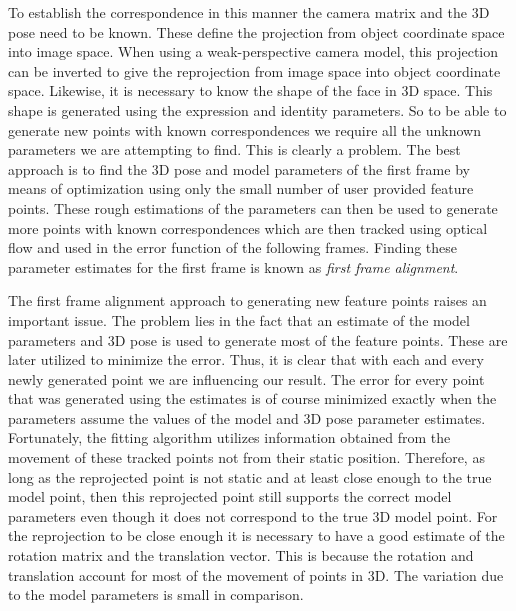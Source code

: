 \documentclass[11pt,a4paper]{report}
\begin{document}
To establish the correspondence in this manner the camera matrix and the 3D pose
need to be
known. These define the projection from object coordinate space into image
space. When using a weak-perspective camera model, this projection can be inverted to give the reprojection from image space into
object coordinate space. Likewise, it is necessary to know the shape of the face in 3D space. This
shape is generated using the expression and identity parameters. So to be able
to generate new points with known correspondences we require all the unknown parameters
we are attempting to find. This is clearly a problem. The best approach is to find the 3D pose and model parameters of the
first frame by means of optimization using only the small number of user provided
feature points. These rough estimations of the parameters can then be used to
generate more points with known correspondences which are then tracked using
optical flow and used in the error function of the following frames. Finding
these parameter estimates for the first frame is known as \textit{first frame
  alignment}.

The first frame alignment approach to generating new feature points raises an
important issue. The problem lies in the fact that an estimate of the model
parameters and 3D pose is used to generate most of the feature points. These are later 
utilized to minimize the error. Thus, it is clear that with each and every newly
generated point we are influencing our result. The error for every point that was generated
using the estimates is of course minimized exactly when the parameters
assume the values of the model and 3D pose parameter estimates. Fortunately,
the fitting algorithm utilizes information obtained from the movement of these tracked
points not from their static position. Therefore, as long as the reprojected
point is not static and at least
close enough to the true model point, then this reprojected point still supports
the correct model parameters even though it does not correspond to the true
3D model point. For the reprojection to be close enough it is necessary to have
a good estimate of the rotation matrix and the translation vector. This is
because the rotation and translation account for most of the movement of points in 3D. The variation
due to the model parameters is small in comparison.
\end{document}
